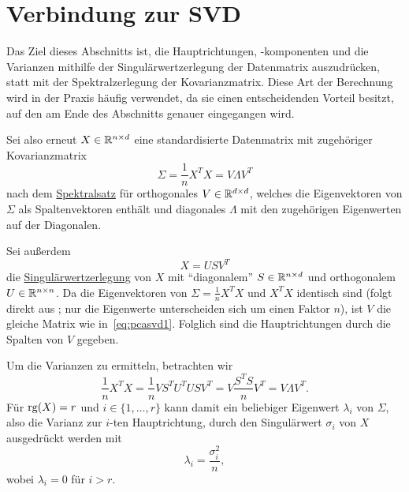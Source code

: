 \section{Verbindung zur SVD}

Das Ziel dieses Abschnitts ist, die Hauptrichtungen, -komponenten und die Varianzen mithilfe der Singulärwertzerlegung der Datenmatrix auszudrücken, statt mit der Spektralzerlegung der Kovarianzmatrix.
Diese Art der Berechnung wird in der Praxis häufig verwendet, da sie einen entscheidenden Vorteil besitzt, auf den am Ende des Abschnitts genauer eingegangen wird.

Sei also erneut \(X \in \mathbb{R}^{n \times d}\) eine standardisierte Datenmatrix mit zugehöriger Kovarianzmatrix
\begin{equation}
    \Sigma = \frac{1}{n}X^{T}X = V \Lambda V^{T} \label{eq:pcasvd1}
\end{equation}
nach dem \hyperref[spec]{Spektralsatz} für orthogonales \(V \in \mathbb{R}^{d \times d}\), welches die Eigenvektoren von \(\Sigma\) als Spaltenvektoren enthält und diagonales \(\Lambda\) mit den zugehörigen Eigenwerten auf der Diagonalen.

Sei außerdem
\begin{equation*}
    X = USV^{T}
\end{equation*}
die \hyperref[th:svd]{Singulärwertzerlegung} von \(X\) mit \enquote{diagonalem} \(S \in \mathbb{R}^{n \times d}\) und orthogonalem \(U \in \mathbb{R}^{n \times n}\).
Da die Eigenvektoren von \(\Sigma = \frac{1}{n}X^{T}X\) und \(X^{T}X\) identisch sind (folgt direkt aus ; nur die Eigenwerte unterscheiden sich um einen Faktor \(n\)), ist \(V\) die gleiche Matrix wie in~\eqref{eq:pcasvd1}. 
Folglich sind die Hauptrichtungen durch die Spalten von \(V\) gegeben.  

Um die Varianzen zu ermitteln, betrachten wir
\begin{equation*}
    \frac{1}{n}X^{T}X = \frac{1}{n}VS^{T}U^{T}USV^{T} = V\frac{S^{T}S}{n}V^{T} = V\Lambda V^{T}.
\end{equation*} 
Für \(\operatorname{rg}(X) = r\) und \(i \in \{1,\ldots,r\}\) kann damit ein beliebiger Eigenwert \(\lambda_{i}\) von \(\Sigma\), also die Varianz zur \(i\)-ten Hauptrichtung, durch den Singulärwert \(\sigma_{i}\) von \(X\) ausgedrückt werden mit
\begin{equation*}
    \lambda_{i} = \frac{\sigma_{i}^{2}}{n}, 
\end{equation*}  
wobei \(\lambda_{i} = 0\) für \(i > r\).

